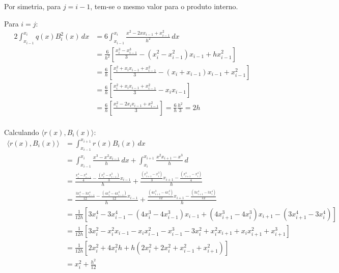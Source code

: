 \documentclass{article}
\begin{document}
    Por simetria, para $ j = i - 1 $, tem-se o mesmo valor para o produto interno.

    Para $ i = j $:
    \begin{align*} 2\int_{x_{i - 1}}^{x_i} q(x) B_i^2(x)\, dx & = 6\int_{x_{i - 1}}^{x_i} \frac{x^2-2xx_{i-1}+x_{i-1}^2}{h^2}\, dx \\
     & = \frac{6}{h^2}\left[\frac{x_i^3 - x_{i - 1}^3}{3} - (x_i^2 - x_{i - 1}^2)x_{i-1}+hx_{i-1}^2\right] \\
     & = \frac{6}{h}\left[\frac{x_i^2 + x_ix_{i - 1} + x_{i - 1}^2}{3} - (x_i + x_{i - 1})x_{i-1}+x_{i-1}^2\right] \\
     & = \frac{6}{h}\left[\frac{x_i^2 + x_ix_{i - 1} + x_{i - 1}^2}{3} - x_ix_{i - 1}\right] \\
     & = \frac{6}{h}\left[\frac{x_i^2 - 2x_ix_{i - 1} + x_{i - 1}^2}{3}\right] = \frac{6}{h}\frac{h^2}{3} = 2h \\
    \end{align*}

    Calculando $\langle r(x), B_i(x)\rangle$:
    \begin{align*} \langle r(x), B_i(x)\rangle &= \int_{x_{i - 1}}^{x_{i + 1}} r(x) B_i(x) \, dx \\
    & = \int_{x_{i - 1}}^{x_{i}} \frac{x^3-x^2x_{i-1}}{h}\, dx + \int_{x_{i}}^{x_{i + 1}} \frac{x^2x_{i+1}-x^3}{h}\, d \\
    & = \frac{\frac{x_i^4 - x_{i - 1}^4}{4} - \frac{(x_i^3 - x_{i - 1}^3)}{3}x_{i-1}}{h} + \frac{\frac{(x_{i + 1}^3 - x_i^3)}{3}x_{i+1}-\frac{(x_{i + 1}^4 - x_i^4)}{4}}{h} \\
    & = \frac{\frac{3x_i^4 - 3x_{i - 1}^4}{12} - \frac{(4x_i^3 - 4x_{i - 1}^3)}{12}x_{i-1}}{h} + \frac{\frac{(4x_{i + 1}^3 - 4x_i^3)}{12}x_{i+1}-\frac{(3x_{i + 1}^4 - 3x_i^4)}{12}}{h} \\
    & = \frac{1}{12h} \left[3x_i^4 - 3x_{i - 1}^4 - (4x_i^3 - 4x_{i - 1}^3)x_{i-1} + (4x_{i + 1}^3 - 4x_i^3)x_{i+1}-(3x_{i + 1}^4 - 3x_i^4)\right] \\
    & = \frac{1}{12h} [ 3x_i^2 - x_i^2x_{i - 1} - x_ix_{i - 1}^2 - x_{i - 1}^3 - 3x_i^2 + x_i^2x_{i + 1} + x_ix_{i + 1}^2 + x_{i + 1}^3 ] \\
    & = \frac{1}{12h} [ 2x_i^2 + 4x_i^2h + h(2x_i^2 + 2x_i^2 + x_{i - 1}^2 + x_{i + 1}^2) ] \\
    & = x_i^2 + \frac{h^2}{12} \\
    \end{align*}
\end{document}

